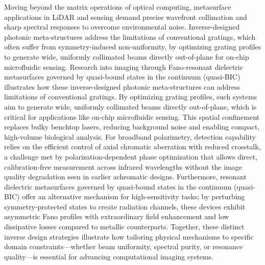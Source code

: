 Moving beyond the matrix operations of optical computing, metasurface applications in LiDAR and sensing demand precise wavefront collimation and sharp spectral responses to overcome environmental noise. Inverse-designed photonic meta-structures address the limitations of conventional gratings, which often suffer from symmetry-induced non-uniformity, by optimizing grating profiles to generate wide, uniformly collimated beams directly out-of-plane for on-chip microfluidic sensing. Research into imaging through Fano-resonant dielectric metasurfaces governed by quasi-bound states in the continuum (quasi-BIC) illustrates how these inverse-designed photonic meta-structures can address limitations of conventional gratings. By optimizing grating profiles, such systems aim to generate wide, uniformly collimated beams directly out-of-plane, which is critical for applications like on-chip microfluidic sensing. \citep{s2_42f2fcc893f3a45ac750a8ffe67752f8533c0c61_58d9419c} This spatial confinement replaces bulky benchtop lasers, reducing background noise and enabling compact, high-volume biological analysis. For broadband polarimetry, detection capability relies on the efficient control of axial chromatic aberration with reduced crosstalk, a challenge met by polarization-dependent phase optimization that allows direct, calibration-free measurement across infrared wavelengths without the image quality degradation seen in earlier achromatic designs. Furthermore, resonant dielectric metasurfaces governed by quasi-bound states in the continuum (quasi-BIC) offer an alternative mechanism for high-sensitivity tasks; by perturbing symmetry-protected states to create radiation channels, these devices exhibit asymmetric Fano profiles with extraordinary field enhancement and low dissipative losses compared to metallic counterparts. Together, these distinct inverse design strategies illustrate how tailoring physical mechanisms to specific domain constraints---whether beam uniformity, spectral purity, or resonance quality---is essential for advancing computational imaging systems. \citep{doi_10_1038_s41598_021_84841_2_2ce5ab57} \citep{doi_10_29026_oea_2022_220058_79ee78ee} \citep{s2_42f2fcc893f3a45ac750a8ffe67752f8533c0c61_58d9419c}

